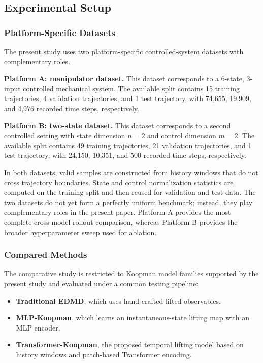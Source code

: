 \documentclass[journal]{IEEEtran}
\begin{document}
\subsection{Experimental Setup}

\subsubsection{Platform-Specific Datasets}

The present study uses two platform-specific controlled-system datasets with complementary roles.

\textbf{Platform A: manipulator dataset.} This dataset corresponds to a 6-state, 3-input controlled mechanical system. The available split contains 15 training trajectories, 4 validation trajectories, and 1 test trajectory, with 74,655, 19,909, and 4,976 recorded time steps, respectively.

\textbf{Platform B: two-state dataset.} This dataset corresponds to a second controlled setting with state dimension $n=2$ and control dimension $m=2$. The available split contains 49 training trajectories, 21 validation trajectories, and 1 test trajectory, with 24,150, 10,351, and 500 recorded time steps, respectively.

In both datasets, valid samples are constructed from history windows that do not cross trajectory boundaries. State and control normalization statistics are computed on the training split and then reused for validation and test data. The two datasets do not yet form a perfectly uniform benchmark; instead, they play complementary roles in the present paper. Platform A provides the most complete cross-model rollout comparison, whereas Platform B provides the broader hyperparameter sweep used for ablation.

\subsubsection{Compared Methods}

The comparative study is restricted to Koopman model families supported by the present study and evaluated under a common testing pipeline:
\begin{itemize}
    \item \textbf{Traditional EDMD}, which uses hand-crafted lifted observables.
    \item \textbf{MLP-Koopman}, which learns an instantaneous-state lifting map with an MLP encoder.
    \item \textbf{Transformer-Koopman}, the proposed temporal lifting model based on history windows and patch-based Transformer encoding.
\end{itemize}
\end{document}
